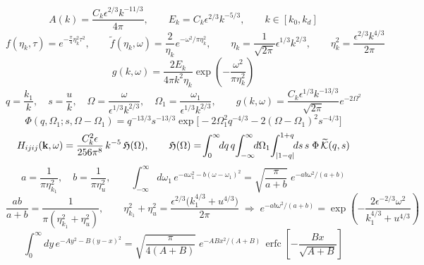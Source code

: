 \documentclass[10pt,prd,aps,nobibnotes,superscriptaddress,preprintnumbers,notitlepage]{revtex4-1}
\newcommand{\kb}{{\bf k}}
\newcommand{\tf}{\tilde{f}}
\begin{document}
\begin{equation}
  A(k)=\frac{C_k\epsilon^{2/3}k^{-11/3}}{4\pi},
  \qquad
  E_k=C_k\epsilon^{2/3}k^{-5/3},
  \qquad
  k\in[k_0,k_d]
  \label{A:AK41}
\end{equation}
\begin{equation}
  f(\eta_k,\tau)=e^{-\frac{\pi}{4}\eta_k^2\tau^2},
  \qquad
  \tf(\eta_k,\omega)=\frac{2}{\eta_k}e^{-\omega^2/\pi\eta_k^2},
  \qquad
  \eta_k=\frac{1}{\sqrt{2\pi}}\epsilon^{1/3}k^{2/3},
  \qquad
  \eta_k^2=\frac{\epsilon^{2/3}k^{4/3}}{2\pi}
  \label{A:etaK41}
\end{equation}
\begin{equation}
  g(k,\omega)=\frac{2E_k}{4\pi k^2\eta_k}\exp\!\left(-\frac{\omega^2}{\pi\eta_k^2}\right)
  \label{A:gK41}
\end{equation}
\begin{equation}
  q=\frac{k_1}{k},\quad s=\frac{u}{k},\quad
  \Omega=\frac{\omega}{\epsilon^{1/3}k^{2/3}},\quad
  \Omega_1=\frac{\omega_1}{\epsilon^{1/3}k^{2/3}},
  \qquad
  g(k,\omega)=\frac{C_k\epsilon^{1/3}k^{-13/3}}{\sqrt{2\pi}}e^{-2\Omega^2}
  \label{A:scaling}
\end{equation}
\begin{equation}
  \Phi(q,\Omega_1;s,\Omega-\Omega_1)
  =q^{-13/3}s^{-13/3}\exp\!\bigl[-2\Omega_1^2q^{-4/3}-2(\Omega-\Omega_1)^2s^{-4/3}\bigr]
  \label{A:Phi}
\end{equation}
\begin{equation}
  H_{ijij}(\kb,\omega)=\frac{C_k^2\epsilon}{256\pi^8}\,k^{-5}\,\mathfrak{H}(\Omega),
  \qquad
  \mathfrak{H}(\Omega)=\!\int_0^\infty\!\!dq\,q\!\int_{-\infty}^{\infty}\!\!d\Omega_1\!\int_{|1-q|}^{1+q}\!\!ds\,s\;
  \Phi\,\widetilde{\mathcal{K}}(q,s)
  \label{A:Hcompact}
\end{equation}
\begin{equation}
  a=\frac{1}{\pi\eta_{k_1}^2},\quad b=\frac{1}{\pi\eta_u^2},
  \qquad
  \int_{-\infty}^{\infty}\!\!d\omega_1\,e^{-a\omega_1^2-b(\omega-\omega_1)^2}
  =\sqrt{\frac{\pi}{a+b}}\;e^{-ab\omega^2/(a+b)}
  \label{A:gaussid}
\end{equation}
\begin{equation}
  \frac{ab}{a+b}=\frac{1}{\pi(\eta_{k_1}^2+\eta_u^2)},
  \qquad
  \eta_{k_1}^2+\eta_u^2=\frac{\epsilon^{2/3}\bigl(k_1^{4/3}+u^{4/3}\bigr)}{2\pi}
  \;\Longrightarrow\;
  e^{-ab\omega^2/(a+b)}=\exp\!\left(-\frac{2\epsilon^{-2/3}\omega^2}{k_1^{4/3}+u^{4/3}}\right)
  \label{A:gaussexp}
\end{equation}
\begin{equation}
  \int_0^{\infty}\!\!dy\,e^{-Ay^2-B(y-x)^2}
  =\sqrt{\frac{\pi}{4(A+B)}}\;e^{-ABx^2/(A+B)}\,
  \operatorname{erfc}\!\left[-\frac{Bx}{\sqrt{A+B}}\right]
  \label{A:erfcid}
\end{equation}
\end{document}

